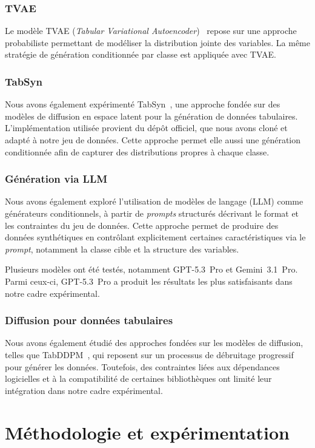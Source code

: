 \documentclass[conference]{IEEEtran}
\begin{document}
\subsubsection{TVAE}
Le modèle TVAE (\textit{Tabular Variational Autoencoder})~\cite{xu2019modeling} repose sur une approche probabiliste permettant de modéliser la distribution jointe des variables. La même stratégie de génération conditionnée par classe est appliquée avec TVAE.

\subsubsection{TabSyn}
Nous avons également expérimenté TabSyn~\cite{zhang2024tabsyn}, une approche fondée sur des modèles de diffusion en espace latent pour la génération de données tabulaires. L'implémentation utilisée provient du dépôt officiel, que nous avons cloné et adapté à notre jeu de données. Cette approche permet elle aussi une génération conditionnée afin de capturer des distributions propres à chaque classe.

\subsubsection{Génération via LLM}
Nous avons également exploré l'utilisation de modèles de langage (LLM) comme générateurs conditionnels, à partir de \textit{prompts} structurés décrivant le format et les contraintes du jeu de données. Cette approche permet de produire des données synthétiques en contrôlant explicitement certaines caractéristiques via le \textit{prompt}, notamment la classe cible et la structure des variables.

Plusieurs modèles ont été testés, notamment GPT-5.3~Pro et Gemini~3.1~Pro. Parmi ceux-ci, GPT-5.3~Pro a produit les résultats les plus satisfaisants dans notre cadre expérimental.

\subsubsection{Diffusion pour données tabulaires}
Nous avons également étudié des approches fondées sur les modèles de diffusion, telles que TabDDPM~\cite{kotelnikov2023tabddpm}, qui reposent sur un processus de débruitage progressif pour générer les données. Toutefois, des contraintes liées aux dépendances logicielles et à la compatibilité de certaines bibliothèques ont limité leur intégration dans notre cadre expérimental.


\section{Méthodologie et expérimentation}
\label{sec:methodo}
\end{document}
